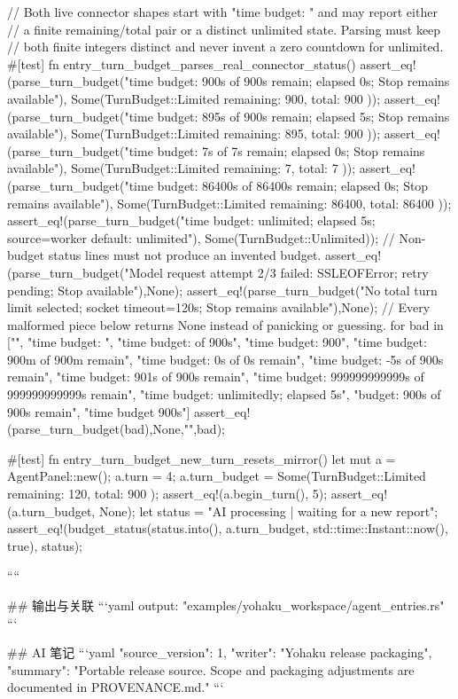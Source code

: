 {    // Both live connector shapes start with "time budget: " and may report either
    // a finite remaining/total pair or a distinct unlimited state. Parsing must keep
    // both finite integers distinct and never invent a zero countdown for unlimited.
    #[test]
    fn entry_turn_budget_parses_real_connector_status() {
        assert_eq!(parse_turn_budget("time budget: 900s of 900s remain; elapsed 0s; Stop remains available"),
            Some(TurnBudget::Limited { remaining: 900, total: 900 }));
        assert_eq!(parse_turn_budget("time budget: 895s of 900s remain; elapsed 5s; Stop remains available"),
            Some(TurnBudget::Limited { remaining: 895, total: 900 }));
        assert_eq!(parse_turn_budget("time budget: 7s of 7s remain; elapsed 0s; Stop remains available"),
            Some(TurnBudget::Limited { remaining: 7, total: 7 }));
        assert_eq!(parse_turn_budget("time budget: 86400s of 86400s remain; elapsed 0s; Stop remains available"),
            Some(TurnBudget::Limited { remaining: 86400, total: 86400 }));
        assert_eq!(parse_turn_budget("time budget: unlimited; elapsed 5s; source=worker default: unlimited"),
            Some(TurnBudget::Unlimited));
        // Non-budget status lines must not produce an invented budget.
        assert_eq!(parse_turn_budget("Model request attempt 2/3 failed: SSLEOFError; retry pending; Stop available"),None);
        assert_eq!(parse_turn_budget("No total turn limit selected; socket timeout=120s; Stop remains available"),None);
        // Every malformed piece below returns None instead of panicking or guessing.
        for bad in ["", "time budget: ", "time budget: of 900s", "time budget: 900",
            "time budget: 900m of 900m remain", "time budget: 0s of 0s remain",
            "time budget: -5s of 900s remain", "time budget: 901s of 900s remain",
            "time budget: 999999999999s of 999999999999s remain",
            "time budget: unlimitedly; elapsed 5s",
            "budget: 900s of 900s remain", "time budget 900s"] {
            assert_eq!(parse_turn_budget(bad),None,"{}",bad);
        }
    }

    #[test]
    fn entry_turn_budget_new_turn_resets_mirror() {
        let mut a = AgentPanel::new();
        a.turn = 4;
        a.turn_budget = Some(TurnBudget::Limited { remaining: 120, total: 900 });
        assert_eq!(a.begin_turn(), 5);
        assert_eq!(a.turn_budget, None);
        let status = "AI processing | waiting for a new report";
        assert_eq!(budget_status(status.into(), a.turn_budget, std::time::Instant::now(), true), status);
    }

}
````

## 输出与关联
```yaml
output: "examples/yohaku_workspace/agent_entries.rs"
```

## AI 笔记
```yaml
{"source_version": 1, "writer": "Yohaku release packaging", "summary": "Portable release source. Scope and packaging adjustments are documented in PROVENANCE.md."}
```
